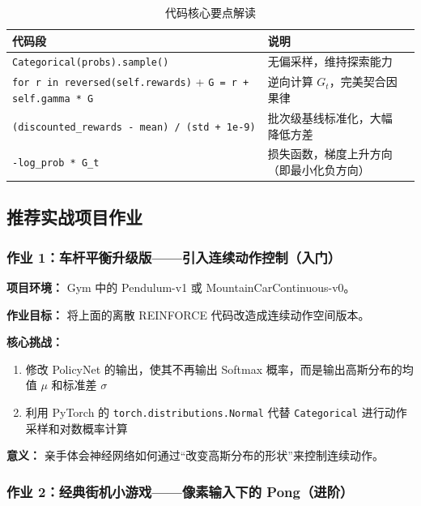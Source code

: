 \documentclass[12pt,a4paper]{article}
\theoremstyle{noteplain}
\theoremstyle{noteexercise}
\begin{document}
\begin{table}[H]
  \centering
  \caption{代码核心要点解读}
  \label{tab:code-key}
  \begin{tabular}{m{5cm}ll}
    \toprule
    \textbf{代码段} & \textbf{说明} \\
    \midrule
    \lstinline|Categorical(probs).sample()| & 无偏采样，维持探索能力 \\
    \midrule
    \lstinline|for r in reversed(self.rewards)| + \lstinline|G = r + self.gamma * G| & 逆向计算 $G_t$，完美契合因果律 \\
    \midrule
    \lstinline|(discounted_rewards - mean) / (std + 1e-9)| & 批次级基线标准化，大幅降低方差 \\
    \midrule
    \lstinline|-log_prob * G_t| & 损失函数，梯度上升方向（即最小化负方向） \\
    \bottomrule
  \end{tabular}
\end{table}

\subsection{推荐实战项目作业}\label{ssec:assignments}

\subsubsection{作业 1：车杆平衡升级版——引入连续动作控制（入门）}

\textbf{项目环境：} Gym 中的 Pendulum-v1 或 MountainCarContinuous-v0。

\textbf{作业目标：} 将上面的离散 REINFORCE 代码改造成连续动作空间版本。

\textbf{核心挑战：}
\begin{enumerate}
  \setlength{\itemsep}{0.2em}
  \item 修改 PolicyNet 的输出，使其不再输出 Softmax 概率，而是输出高斯分布的均值 $\mu$ 和标准差 $\sigma$
  \item 利用 PyTorch 的 \lstinline|torch.distributions.Normal| 代替 \lstinline|Categorical| 进行动作采样和对数概率计算
\end{enumerate}

\textbf{意义：} 亲手体会神经网络如何通过``改变高斯分布的形状''来控制连续动作。

\subsubsection{作业 2：经典街机小游戏——像素输入下的 Pong（进阶）}
\end{document}
